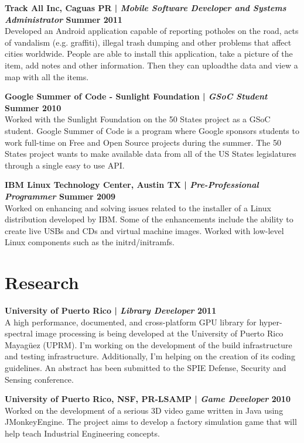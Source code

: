 \documentclass[margin,line]{res}
\begin{document}
\begin{resume}
{\bf Track All Inc, Caguas PR | {\em Mobile Software Developer and Systems Administrator} \hfill {\bf Summer 2011 \\} }
\vspace{-.01cm}
Developed an Android application capable of reporting potholes on the road, acts of vandalism (e.g. graffiti), illegal trash dumping and other problems that affect cities worldwide. People are able to install this application, take a picture of the item, add notes and other information. Then they can uploadthe data and view a map with all the items.

{\bf Google Summer of Code - Sunlight Foundation | {\em GSoC Student} \hfill {\bf Summer 2010 \\} }
\vspace{-.01cm}
Worked with the Sunlight Foundation on the 50 States project as a GSoC student. Google Summer of Code is a program where Google sponsors students to work full-time on Free and Open Source projects during the summer. The 50 States project wants to make available data from all of the US States legislatures through a single easy to use API.

{\bf IBM Linux Technology Center, Austin TX | {\em Pre-Professional Programmer} \hfill {\bf Summer 2009 \\} }
\vspace{-.01cm}
Worked on enhancing and solving issues related to the installer of a Linux distribution developed
by IBM. Some of the enhancements include the ability to create live USBs and CDs and virtual
machine images. Worked with low-level Linux components such as the initrd/initramfs.

\section{\sc Research}

{\bf University of Puerto Rico | {\em Library Developer} \hfill {\bf 2011 \\} }
\vspace{-.01cm}
A high performance, documented, and cross-platform GPU library for hyper-spectral image processing is being developed at the University of Puerto Rico Mayagüez (UPRM). I'm working on the development of the build infrastructure and testing infrastructure. Additionally, I'm helping on the creation of its coding guidelines. An abstract has been submitted to the SPIE Defense, Security and Sensing conference. 

{\bf University of Puerto Rico, NSF, PR-LSAMP | {\em Game Developer} \hfill {\bf 2010 \\} }
\vspace{-.01cm}
Worked on the development of a serious 3D video game written in Java using JMonkeyEngine. The project aims to develop a factory simulation game that will help teach Industrial Engineering concepts.


\end{resume}
\end{document}
